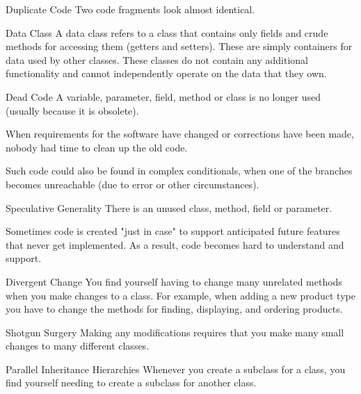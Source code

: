 \documentclass{beamer}
\begin{document}
\begin{frame}{Duplicate Code}
Two code fragments look almost identical.
\end{frame}

\begin{frame}{Data Class}
A data class refers to a class that contains only fields and crude methods for
accessing them (getters and setters). These are simply containers for data used
by other classes. These classes do not contain any additional functionality and
cannot independently operate on the data that they own.  
\end{frame}

\begin{frame}{Dead Code}
A variable, parameter, field, method or class is no longer used (usually because
it is obsolete).

When requirements for the software have changed or corrections have been made,
nobody had time to clean up the old code. 

Such code could also be found in complex conditionals, when one of the branches
becomes unreachable (due to error or other circumstances). 
\end{frame}

\begin{frame}{Speculative Generality}
There is an unused class, method, field or parameter.

Sometimes code is created "just in case" to support anticipated future features
that never get implemented. As a result, code becomes hard to understand and
support.  
\end{frame}

\begin{frame}{Divergent Change}
You find yourself having to change many unrelated methods when you make changes
to a class. For example, when adding a new product type you have to change the
methods for finding, displaying, and ordering products. 
\end{frame}

\begin{frame}{Shotgun Surgery}
Making any modifications requires that you make many small changes to many
different classes.
\end{frame}

\begin{frame}{Parallel Inheritance Hierarchies}
Whenever you create a subclass for a class, you find yourself needing to create
a subclass for another class.
\end{frame}
\end{document}
